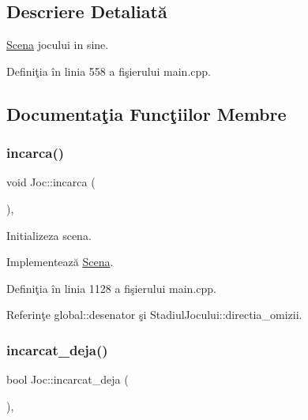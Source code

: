 \subsection{Descriere Detaliată}
\hyperlink{classScena}{Scena} jocului in sine. 

Definiţia în linia 558 a fişierului main.\+cpp.



\subsection{Documentaţia Funcţiilor Membre}
\mbox{\label{classJoc_a54976207efdeeb45b42fd639215b65e3}} 
\subsubsection{\texorpdfstring{incarca()}{incarca()}}
{\footnotesize\ttfamily void Joc\+::incarca (\begin{DoxyParamCaption}\item[{\hyperlink{classStadiulJocului}{Stadiul\+Jocului} \&}]{ }\end{DoxyParamCaption})\hspace{0.3cm}{\ttfamily [override]}, {\ttfamily [virtual]}}

Initializeza scena. 

Implementează \hyperlink{classScena_a6f53a1dcef68084361dc8f9d56bbb8c0}{Scena}.



Definiţia în linia 1128 a fişierului main.\+cpp.



Referinţe global\+::desenator şi Stadiul\+Jocului\+::directia\+\_\+omizii.

\mbox{\label{classJoc_ac78ae0ddb45250af612eb68de253861e}} 
\subsubsection{\texorpdfstring{incarcat\+\_\+deja()}{incarcat\_deja()}}
{\footnotesize\ttfamily bool Joc\+::incarcat\+\_\+deja (\begin{DoxyParamCaption}{ }\end{DoxyParamCaption})\hspace{0.3cm}{\ttfamily [override]}, {\ttfamily [virtual]}}

